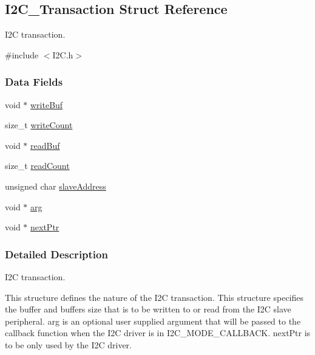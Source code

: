 \subsection{I2\+C\+\_\+\+Transaction Struct Reference}
\label{struct_i2_c___transaction}


I2\+C transaction.  




{\ttfamily \#include $<$I2\+C.\+h$>$}

\subsubsection*{Data Fields}
\begin{DoxyCompactItemize}
\item 
void $\ast$ \hyperlink{struct_i2_c___transaction_aa3490c2af4b443a7a4ec13f57aec6d20}{write\+Buf}
\item 
size\+\_\+t \hyperlink{struct_i2_c___transaction_a08959a9f098163d02d6002e73b3a4606}{write\+Count}
\item 
void $\ast$ \hyperlink{struct_i2_c___transaction_a804b918d5cb08bb75a39866d0b89e01e}{read\+Buf}
\item 
size\+\_\+t \hyperlink{struct_i2_c___transaction_a2085d4c943f0d8617365b7c427e6a0de}{read\+Count}
\item 
unsigned char \hyperlink{struct_i2_c___transaction_a165300f1959631edfccd21f0ae052e1b}{slave\+Address}
\item 
void $\ast$ \hyperlink{struct_i2_c___transaction_a29ec65addac2d4ef5d1235c2329e2fc1}{arg}
\item 
void $\ast$ \hyperlink{struct_i2_c___transaction_a21755edd4d999d6041d303e269596371}{next\+Ptr}
\end{DoxyCompactItemize}


\subsubsection{Detailed Description}
I2\+C transaction. 

This structure defines the nature of the I2\+C transaction. This structure specifies the buffer and buffer\textquotesingle{}s size that is to be written to or read from the I2\+C slave peripheral. arg is an optional user supplied argument that will be passed to the callback function when the I2\+C driver is in I2\+C\+\_\+\+M\+O\+D\+E\+\_\+\+C\+A\+L\+L\+B\+A\+C\+K. next\+Ptr is to be only used by the I2\+C driver. 

